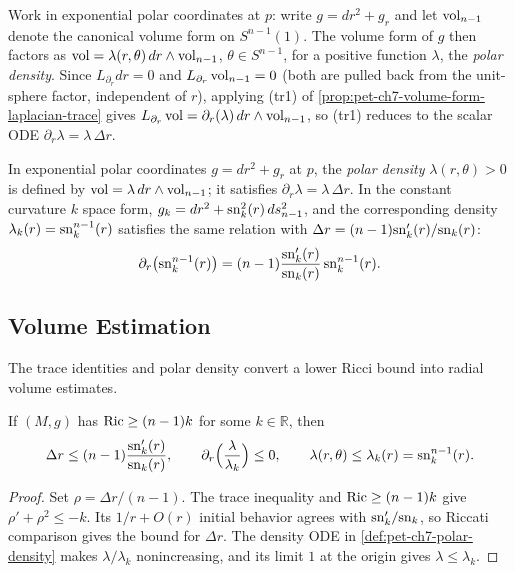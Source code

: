 Work in exponential polar coordinates at $p$: write $g=dr^2+g_r$ and let
$\operatorname{vol}_{n-1}$ denote the canonical volume form on $S^{n-1}(1)$. The volume form
of $g$ then factors as $\operatorname{vol}=\lambda(r,\theta)\,dr\wedge\operatorname{vol}_{n-1}$,
$\theta\in S^{n-1}$, for a positive function $\lambda$, the \emph{polar
density}. Since $L_{\partial_r}dr=0$ and $L_{\partial_r}\operatorname{vol}_{n-1}=0$ (both
are pulled back from the unit-sphere factor, independent of $r$), applying
(tr1) of \cref{prop:pet-ch7-volume-form-laplacian-trace} gives
$L_{\partial_r}\operatorname{vol}=\partial_r(\lambda)\,dr
\wedge\operatorname{vol}_{n-1}$, so (tr1) reduces to the scalar ODE
$\partial_r\lambda=\lambda\,\Delta r$.

\begin{definition}
  \label{def:pet-ch7-polar-density}
  In exponential polar coordinates $g=dr^2+g_r$ at $p$, the \emph{polar
  density} $\lambda(r,\theta)>0$ is defined by
  $\operatorname{vol}=\lambda\,dr\wedge\operatorname{vol}_{n-1}$; it satisfies
  $\partial_r\lambda=\lambda\,\Delta r$. In the constant curvature $k$ space
  form, $g_k=dr^2+\mathrm{sn}_k^2(r)\,ds_{n-1}^2$, and the corresponding density
  $\lambda_k(r)=\mathrm{sn}_k^{n-1}(r)$ satisfies the same relation with
  $\Delta r=(n-1)\mathrm{sn}_k'(r)/\mathrm{sn}_k(r)$:
  \[
    \partial_r\big(\mathrm{sn}_k^{n-1}(r)\big)
    =(n-1)\frac{\mathrm{sn}_k'(r)}{\mathrm{sn}_k(r)}\,\mathrm{sn}_k^{n-1}(r).
  \]
\end{definition}

\subsection{Volume Estimation}

The trace identities and polar density convert a lower Ricci bound into
radial volume estimates.

\begin{lemma}
  \label{lem:pet-ch7-ricci-comparison-mean-curvature}
  If $(M,g)$ has $\operatorname{Ric}\ge(n-1)k$ for some $k\in\mathbb{R}$, then
  \[
    \Delta r\le(n-1)\frac{\mathrm{sn}_k'(r)}{\mathrm{sn}_k(r)},
    \qquad
    \partial_r\Big(\frac{\lambda}{\lambda_k}\Big)\le0,
    \qquad
    \lambda(r,\theta)\le\lambda_k(r)=\mathrm{sn}_k^{n-1}(r).
  \]
\end{lemma}
\begin{proof}
  \sketch
  Set \(\rho=\Delta r/(n-1)\). The trace inequality and \(\operatorname{Ric}\ge(n-1)k\) give \(\rho'+\rho^2\le-k\). Its \(1/r+O(r)\) initial behavior agrees with \(\mathrm{sn}_k'/\mathrm{sn}_k\), so Riccati comparison gives the bound for \(\Delta r\). The density ODE in \cref{def:pet-ch7-polar-density} makes \(\lambda/\lambda_k\) nonincreasing, and its limit \(1\) at the origin gives \(\lambda\le\lambda_k\).
\end{proof}


